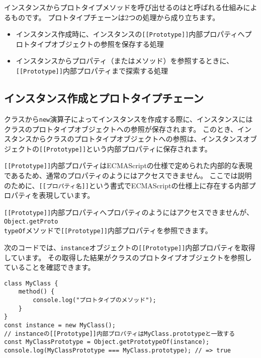 インスタンスからプロトタイプメソッドを呼び出せるのは\textbf{}と呼ばれる仕組みによるものです。
プロトタイプチェーンは2つの処理から成り立ちます。

\begin{itemize}
\item
  インスタンス作成時に、インスタンスの\texttt{[[Prototype]]}内部プロパティへプロトタイプオブジェクトの参照を保存する処理
\item
  インスタンスからプロパティ（またはメソッド）を参照するときに、\texttt{[[Prototype]]}内部プロパティまで探索する処理
\end{itemize}

\hypertarget{write-prototype-chain}{%
\subsection{インスタンス作成とプロトタイプチェーン}\label{write-prototype-chain}}

クラスから\texttt{new}演算子によってインスタンスを作成する際に、インスタンスにはクラスのプロトタイプオブジェクトへの参照が保存されます。
このとき、インスタンスからクラスのプロトタイプオブジェクトへの参照は、インスタンスオブジェクトの\texttt{[[Prototype]]}という内部プロパティに保存されます。

\texttt{[[Prototype]]}内部プロパティはECMAScriptの仕様で定められた内部的な表現であるため、通常のプロパティのようにはアクセスできません。
ここでは説明のために、\texttt{[[プロパティ名]]}という書式でECMAScriptの仕様上に存在する内部プロパティを表現しています。

\texttt{[[Prototype]]}内部プロパティへプロパティのようにはアクセスできませんが、\texttt{Object.getProto\\typeOf}メソッドで\texttt{[[Prototype]]}内部プロパティを参照できます。

次のコードでは、\texttt{instance}オブジェクトの\texttt{[[Prototype]]}内部プロパティを取得しています。
その取得した結果がクラスのプロトタイプオブジェクトを参照していることを確認できます。

\begin{lstlisting}
class MyClass {
    method() {
        console.log("プロトタイプのメソッド");
    }
}
const instance = new MyClass();
// instanceの[[Prototype]]内部プロパティはMyClass.prototypeと一致する
const MyClassPrototype = Object.getPrototypeOf(instance);
console.log(MyClassPrototype === MyClass.prototype); // => true
\end{lstlisting}

